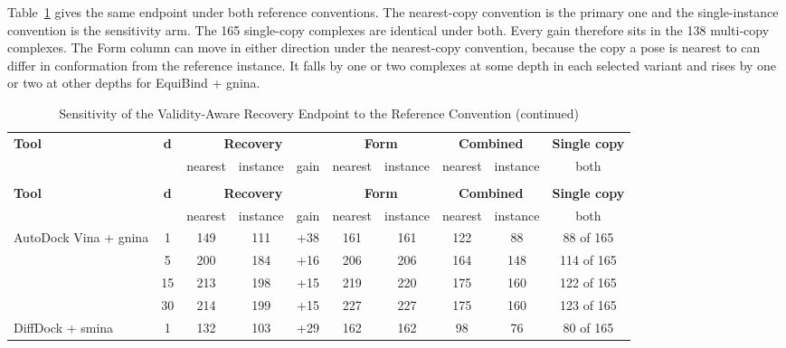 Table~\ref{tab:reference_convention_sensitivity} gives the same endpoint under both reference conventions. The nearest-copy convention is the primary one and the single-instance convention is the sensitivity arm. The 165 single-copy complexes are identical under both. Every gain therefore sits in the 138 multi-copy complexes. The Form column can move in either direction under the nearest-copy convention, because the copy a pose is nearest to can differ in conformation from the reference instance. It falls by one or two complexes at some depth in each selected variant and rises by one or two at other depths for EquiBind + gnina.

\begingroup
\scriptsize
\setlength{\tabcolsep}{3pt}
\begin{longtable}[]{@{}lccccccccc@{}}
\caption[Reference-Convention Sensitivity of the Recovery Endpoint]{Sensitivity of the Validity-Aware Recovery Endpoint to the Reference Convention}\label{tab:reference_convention_sensitivity}\tabularnewline
\toprule\noalign{}
{\raggedright \textbf{Tool}} & \textbf{d} & \multicolumn{3}{c}{\textbf{Recovery}} & \multicolumn{2}{c}{\textbf{Form}} & \multicolumn{2}{c}{\textbf{Combined}} & \textbf{Single copy} \\
\cmidrule(lr){3-5}\cmidrule(lr){6-7}\cmidrule(lr){8-9}\cmidrule(lr){10-10}
 & & nearest & instance & gain & nearest & instance & nearest & instance & both \\
\midrule\noalign{}
\endfirsthead
\caption[]{Sensitivity of the Validity-Aware Recovery Endpoint to the Reference Convention (continued)}\tabularnewline
\toprule\noalign{}
{\raggedright \textbf{Tool}} & \textbf{d} & \multicolumn{3}{c}{\textbf{Recovery}} & \multicolumn{2}{c}{\textbf{Form}} & \multicolumn{2}{c}{\textbf{Combined}} & \textbf{Single copy} \\
\cmidrule(lr){3-5}\cmidrule(lr){6-7}\cmidrule(lr){8-9}\cmidrule(lr){10-10}
 & & nearest & instance & gain & nearest & instance & nearest & instance & both \\
\midrule\noalign{}
\endhead
\bottomrule\noalign{}
\endlastfoot
AutoDock Vina + gnina & 1 & 149 & 111 & +38 & 161 & 161 & 122 & 88 & 88 of 165 \\
 & 5 & 200 & 184 & +16 & 206 & 206 & 164 & 148 & 114 of 165 \\
 & 15 & 213 & 198 & +15 & 219 & 220 & 175 & 160 & 122 of 165 \\
 & 30 & 214 & 199 & +15 & 227 & 227 & 175 & 160 & 123 of 165 \\
DiffDock + smina & 1 & 132 & 103 & +29 & 162 & 162 & 98 & 76 & 80 of 165 \\

\end{longtable}
